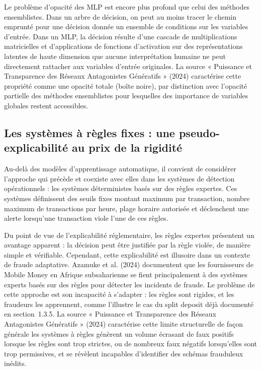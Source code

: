 \documentclass[11pt,a4paper,oneside]{report}
\theoremstyle{definition}
\theoremstyle{remark}
\begin{document}
Le problème d'opacité des MLP est encore plus profond que celui des méthodes ensemblistes. Dans un arbre de décision, on peut au moins tracer le chemin emprunté pour une décision donnée  un ensemble de conditions sur les variables d'entrée. Dans un MLP, la décision résulte d'une cascade de multiplications matricielles et d'applications de fonctions d'activation sur des représentations latentes de haute dimension que aucune interprétation humaine ne peut directement rattacher aux variables d'entrée originales. La source « Puissance et Transparence des Réseaux Antagonistes Génératifs » (2024) caractérise cette propriété comme une opacité totale (boîte noire), par distinction avec l'opacité partielle des méthodes ensemblistes pour lesquelles des importance de variables globales restent accessibles.

\subsection{Les systèmes à règles fixes : une pseudo-explicabilité au prix de la rigidité}

Au-delà des modèles d'apprentissage automatique, il convient de considérer l'approche qui précède et coexiste avec elles dans les systèmes de détection opérationnels : les systèmes déterministes basés sur des règles expertes. Ces systèmes définissent des seuils fixes  montant maximum par transaction, nombre maximum de transactions par heure, plage horaire autorisée  et déclenchent une alerte lorsqu'une transaction viole l'une de ces règles.

Du point de vue de l'explicabilité réglementaire, les règles expertes présentent un avantage apparent : la décision peut être justifiée par la règle violée, de manière simple et vérifiable. Cependant, cette explicabilité est illusoire dans un contexte de fraude adaptative. Azamuke et al. (2024) documentent que les fournisseurs de Mobile Money en Afrique subsaharienne se fient principalement à des systèmes experts basés sur des règles pour détecter les incidents de fraude. Le problème de cette approche est son incapacité à s'adapter : les règles sont rigides, et les fraudeurs les apprennent, comme l'illustre le cas du split deposit déjà documenté en section~1.3.5. La source « Puissance et Transparence des Réseaux Antagonistes Génératifs » (2024) caractérise cette limite structurelle de façon générale  les systèmes à règles génèrent un volume écrasant de faux positifs lorsque les règles sont trop strictes, ou de nombreux faux négatifs lorsqu'elles sont trop permissives, et se révèlent incapables d'identifier des schémas frauduleux inédits.
\end{document}
